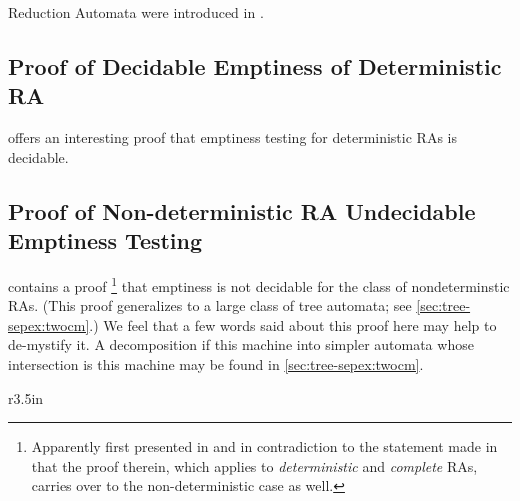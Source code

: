 Reduction Automata were introduced in \cite{dauchet:reduction}.



\subsection{Proof of Decidable Emptiness of Deterministic RA}

\cite[\S 4.1]{dauchet:reduction} offers an interesting proof that emptiness
testing for deterministic RAs is decidable.  

\subsection{Proof of Non-deterministic RA Undecidable Emptiness Testing}
\label{sec:zoo-tree/ra:ndempty}

\cite[Thm 4.4.7]{tata} contains a proof%
%
\footnote{Apparently first presented in \cite[Appendix
C]{jacquemard:tamodeq} and in contradiction to the statement made in
\cite[\S 4.1]{dauchet:reduction} that the proof therein, which applies to
{\em deterministic} and {\em complete} RAs, carries over to the
non-deterministic case as well.}
%
that emptiness is not decidable for the class of nondeterminstic RAs.  (This
proof generalizes to a large class of tree automata; see
\autoref{sec:tree-sepex:twocm}.)  We feel that a few words said about this
proof here may help to de-mystify it.  A decomposition if this machine into
simpler automata whose intersection is this machine may be found in
\ref{sec:tree-sepex:twocm}.

\begin{wrapfigure}{r}{3.5in}\centering{}\end{wrapfigure}


